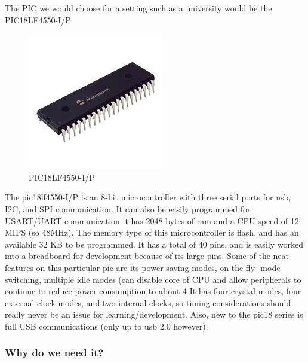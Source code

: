 \documentclass[12pt]{article}
\begin{document}
The PIC we would choose for a setting such as a university would be the
PIC18LF4550-I/P

\begin{figure}[h!]
  \centering
  \includegraphics[scale=.5]{images/pic}
  \caption{PIC18LF4550-I/P}
  \label{img:pic}
\end{figure}


The pic18lf4550-I/P is an 8-bit microcontroller with three serial ports for usb, I2C, and SPI
communication. It can also be easily programmed for USART/UART communication it has 2048
bytes of ram and a CPU speed of 12 MIPS (so 48MHz). The memory type of this microcontroller
is flash, and has an available 32 KB to be programmed. It has a total of 40 pins, and is easily
worked into a breadboard for development because of its large pins.
Some of the neat features on this particular pic are its power saving modes, on-the-fly- mode
switching, multiple idle modes (can disable core of CPU and allow peripherals to continue to reduce
power consumption to about 4%
It has four crystal modes, four external clock modes, and two internal clocks, so timing
considerations should really never be an issue for learning/development.
Also, new to the pic18 series is full USB communications (only up to usb 2.0 however).

\subsubsection{Why do we need it?}
\end{document}
